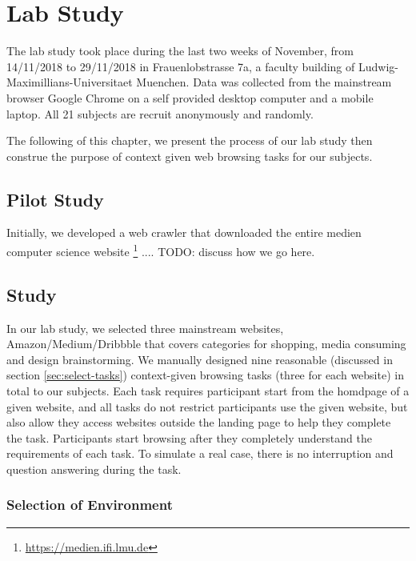 \section{Lab Study}
\label{ch:exp}

The lab study took place during the last two weeks of November, from 14/11/2018 to 29/11/2018
in Frauenlobstrasse 7a, a faculty building of Ludwig-Maximillians-Universitaet Muenchen.
Data was collected from the mainstream browser Google Chrome on a self provided 
desktop computer and a mobile laptop. All 21 subjects are recruit anonymously and randomly.

The following of this chapter, we present the process of our lab study then construe the purpose 
of context given web browsing tasks for our subjects.


\subsection{Pilot Study}

Initially, we developed a web crawler that downloaded the entire medien computer science website 
\footnote{\url{https://medien.ifi.lmu.de}}
.... TODO: discuss how we go here.

\subsection{Study}

In our lab study, we selected three mainstream websites, Amazon/Medium/Dribbble 
that covers categories for shopping, media consuming and design brainstorming. 
We manually designed nine reasonable (discussed in section \ref{sec:select-tasks})
context-given browsing tasks (three for each website) in total to our subjects.
Each task requires participant start from the homdpage of a given website, and
all tasks do not restrict participants use the given website, but also allow they 
access websites outside the landing page to help they complete the task.
Participants start browsing after they completely understand the requirements of each task.
To simulate a real case, there is no interruption and question answering during the task.

\subsubsection{Selection of Environment}

